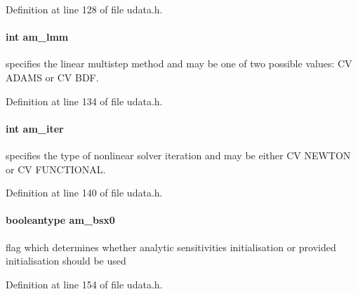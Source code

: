 Definition at line 128 of file udata.\+h.

\hypertarget{struct_user_data_a18b6fbc6159783acab9b5f4b106077cd}{}
\paragraph[{am\+\_\+lmm}]{\setlength{\rightskip}{0pt plus 5cm}int am\+\_\+lmm}\label{struct_user_data_a18b6fbc6159783acab9b5f4b106077cd}
specifies the linear multistep method and may be one of two possible values\+: C\+V A\+D\+A\+M\+S or C\+V B\+D\+F. 

Definition at line 134 of file udata.\+h.

\hypertarget{struct_user_data_a2e0183eade68209e6835d3199054f0cc}{}
\paragraph[{am\+\_\+iter}]{\setlength{\rightskip}{0pt plus 5cm}int am\+\_\+iter}\label{struct_user_data_a2e0183eade68209e6835d3199054f0cc}
specifies the type of nonlinear solver iteration and may be either C\+V N\+E\+W\+T\+O\+N or C\+V F\+U\+N\+C\+T\+I\+O\+N\+A\+L. 

Definition at line 140 of file udata.\+h.

\hypertarget{struct_user_data_a87d2f917b1bea7fea2d5878ccd43c7db}{}
\paragraph[{am\+\_\+bsx0}]{\setlength{\rightskip}{0pt plus 5cm}booleantype am\+\_\+bsx0}\label{struct_user_data_a87d2f917b1bea7fea2d5878ccd43c7db}
flag which determines whether analytic sensitivities initialisation or provided initialisation should be used 

Definition at line 154 of file udata.\+h.

